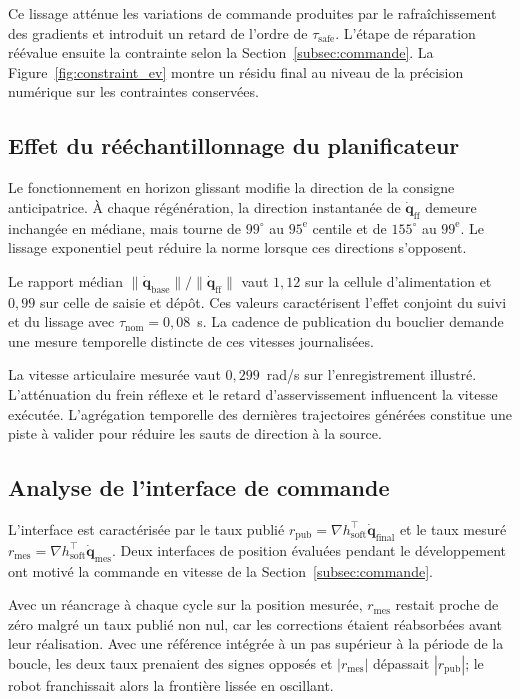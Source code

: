 Ce lissage atténue les variations de commande produites par le rafraîchissement des gradients et introduit un retard de l'ordre de $\tau_{\mathrm{safe}}$. L'étape de réparation réévalue ensuite la contrainte selon la Section~\ref{subsec:commande}. La Figure~\ref{fig:constraint_ev} montre un résidu final au niveau de la précision numérique sur les contraintes conservées.

\subsection*{Effet du rééchantillonnage du planificateur}\label{subsec:res_replan}
Le fonctionnement en horizon glissant modifie la direction de la consigne anticipatrice. À chaque régénération, la direction instantanée de $\dot{\mathbf q}_{\mathrm{ff}}$ demeure inchangée en médiane, mais tourne de $99^\circ$ au $95^{\text{e}}$ centile et de $155^\circ$ au $99^{\text{e}}$. Le lissage exponentiel peut réduire la norme lorsque ces directions s'opposent.

Le rapport médian $\|\dot{\mathbf q}_{\mathrm{base}}\|/\|\dot{\mathbf q}_{\mathrm{ff}}\|$ vaut $1{,}12$ sur la cellule d'alimentation et $0{,}99$ sur celle de saisie et dépôt. Ces valeurs caractérisent l'effet conjoint du suivi et du lissage avec $\tau_{\mathrm{nom}}=0{,}08$~s. La cadence de publication du bouclier demande une mesure temporelle distincte de ces vitesses journalisées.

La vitesse articulaire mesurée vaut $0{,}299$~rad/s sur l'enregistrement illustré. L'atténuation du frein réflexe et le retard d'asservissement influencent la vitesse exécutée. L'agrégation temporelle des dernières trajectoires générées constitue une piste à valider pour réduire les sauts de direction à la source.

\subsection*{Analyse de l'interface de commande}\label{subsec:res_interface}
L'interface est caractérisée par le taux publié $r_{\mathrm{pub}}=\nabla h_{\mathrm{soft}}^\top\dot{\mathbf q}_{\mathrm{final}}$ et le taux mesuré $r_{\mathrm{mes}}=\nabla h_{\mathrm{soft}}^\top\dot{\mathbf q}_{\mathrm{mes}}$. Deux interfaces de position évaluées pendant le développement ont motivé la commande en vitesse de la Section~\ref{subsec:commande}.

Avec un réancrage à chaque cycle sur la position mesurée, $r_{\mathrm{mes}}$ restait proche de zéro malgré un taux publié non nul, car les corrections étaient réabsorbées avant leur réalisation. Avec une référence intégrée à un pas supérieur à la période de la boucle, les deux taux prenaient des signes opposés et $|r_{\mathrm{mes}}|$ dépassait $|r_{\mathrm{pub}}|$; le robot franchissait alors la frontière lissée en oscillant.

